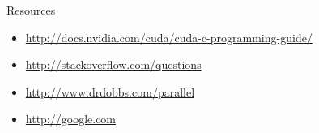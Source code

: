 \documentclass{beamer}
\begin{document}
\begin{frame}[fragile]{Resources}
\begin{itemize}
\item \url{http://docs.nvidia.com/cuda/cuda-c-programming-guide/}
\item \url{http://stackoverflow.com/questions}
\item \url{http://www.drdobbs.com/parallel}
\item \url{http://google.com}
\end{itemize}
\end{frame}
\end{document}
